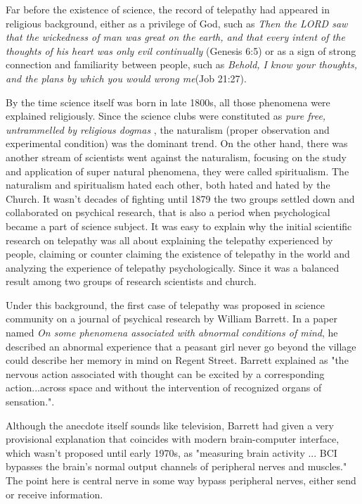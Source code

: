 \documentclass[a4paper]{article}
\begin{document}
Far before the existence of science, the record of telepathy had appeared in religious background, either as a privilege of God, such as \textit{Then the LORD saw that the wickedness of man was great on the earth, and that every intent of the thoughts of his heart was only evil continually} (Genesis 6:5) or as a sign of strong connection and familiarity between people, such as \textit{Behold, I know your thoughts, and the plans by which you would wrong me}(Job 21:27).

By the time science itself was born in late 1800s, all those phenomena were explained religiously. Since the science clubs were constituted as \textit{pure free, untrammelled by religious dogmas} \autocite{feist2017religion}, the naturalism (proper observation and experimental condition) was the dominant trend. On the other hand, there was another stream of scientists went against the naturalism, focusing on the study and application of super natural phenomena, they were called spiritualism. The naturalism and spiritualism hated each other, both hated and hated by the Church. It wasn't decades of fighting until 1879 the two groups settled down and collaborated on psychical research, that is also a period when psychological became a part of science subject. It was easy to explain why the initial scientific research on telepathy was all about explaining the telepathy experienced by people, claiming or counter claiming the existence of telepathy in the world\autocite{luckhurst2002invention} and analyzing the experience of telepathy psychologically. Since it was a balanced result among two groups of research scientists and church. 

Under this background, the first case of telepathy was proposed in science community on a journal of psychical research by William Barrett\autocite{luckhurst2002invention}. In a paper named \textit{On some phenomena associated with abnormal conditions of mind}, he described an abnormal experience that a peasant girl never go beyond the village could describe her memory in mind on Regent Street. \autocite{barrett1882some} Barrett explained as "the nervous action associated with thought can be excited by a corresponding action...across space and without the intervention of recognized organs of sensation."\autocite{luckhurst2002invention}.

Although the anecdote itself sounds like television, Barrett had given a very provisional explanation that coincides with modern brain-computer interface, which wasn't proposed until early 1970s, as "measuring brain activity ... BCI bypasses the brain’s normal output channels of peripheral nerves and muscles."\autocite{zander2014towards} The point here is central nerve in some way bypass peripheral nerves, either send or receive information. 
\end{document}
